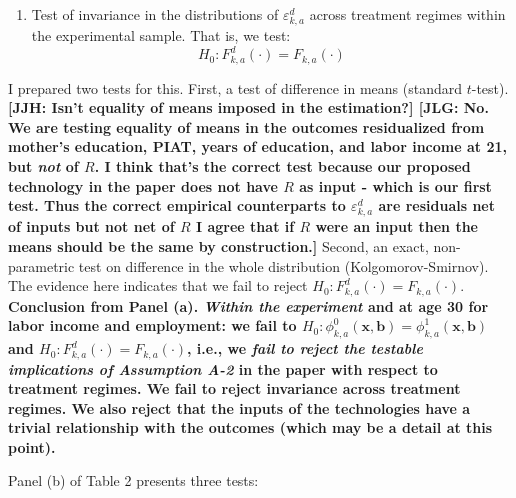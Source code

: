 \begin{enumerate}
\item Test of invariance in the distributions of $\varepsilon_{k,a}^d$ across treatment regimes within the experimental sample. That is, we test:
	\begin{equation} 
	H_0: F_{k,a}^d \left( \cdot \right) = F_{k,a} \left( \cdot \right)
	\end{equation}
\end{enumerate}

\noindent I prepared two tests for this. First, a test of difference in means (standard $t$-test). \textbf{[JJH: Isn't equality of means imposed in the estimation?] [JLG: No. We are testing equality of means in the outcomes residualized from mother's education, PIAT, years of education, and labor income at 21, but \textit{not} of $R$. I think that's the correct test because our proposed technology in the paper does not have $R$ as input - which is our first test. Thus the correct empirical counterparts to $\varepsilon_{k,a}^d$ are residuals net of inputs but not net of $R$ I agree that if $R$ were an input then the means should be the same by construction.]} Second, an exact, non-parametric test on difference in the whole distribution (Kolgomorov-Smirnov). The evidence here indicates that we fail to reject $H_0: F_{k,a}^d \left( \cdot \right) = F_{k,a} \left( \cdot \right)$.\\ 

\noindent \textbf{Conclusion from Panel (a). \textit{Within the experiment} and at age 30 for labor income and employment: we fail to $H_0: \phi_{k,a}^0 \left( \bm{x}, \bm{b} \right) = \phi_{k,a}^1 \left( \bm{x}, \bm{b} \right)$ and $H_0: F_{k,a}^d \left( \cdot \right) = F_{k,a} \left( \cdot \right)$, i.e., we \textit{fail to reject the testable implications of Assumption A-2} in the paper with respect to treatment regimes. We fail to reject invariance across treatment regimes. We also reject that the inputs of the technologies have a trivial relationship with the outcomes (which may be a detail at this point).}

\noindent Panel (b) of Table 2 presents three tests: 

